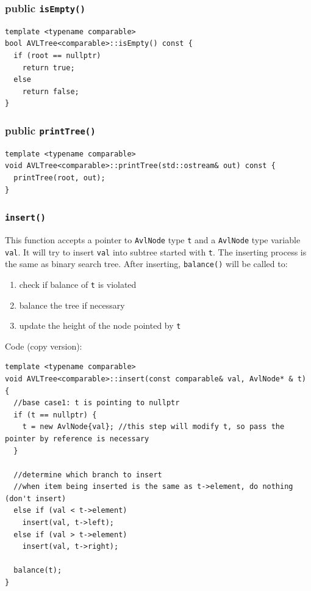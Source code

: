\documentclass[11pt]{book}
\begin{document}
\subsubsection{public \texttt{isEmpty()}}
\label{sec:orgf723b97}
\begin{verbatim}
template <typename comparable>
bool AVLTree<comparable>::isEmpty() const {
  if (root == nullptr)
    return true;
  else 
    return false;
}
\end{verbatim}
\subsubsection{public \texttt{printTree()}}
\label{sec:orga9e7e11}
\begin{verbatim}
template <typename comparable>
void AVLTree<comparable>::printTree(std::ostream& out) const {
  printTree(root, out);
}
\end{verbatim}
\subsubsection{\texttt{insert()}}
\label{sec:org3fa24a5}
This function accepts a pointer to \texttt{AvlNode} type \texttt{t} and a \texttt{AvlNode} type variable \texttt{val}. It will try to insert \texttt{val} into subtree started with \texttt{t}. The inserting process is the same as binary search tree. After inserting, \texttt{balance()} will be called to:
\begin{enumerate}
\item check if balance of \texttt{t} is violated
\item balance the tree if necessary
\item update the height of the node pointed by \texttt{t}
\end{enumerate}

Code (copy version):
\begin{verbatim}
template <typename comparable>
void AVLTree<comparable>::insert(const comparable& val, AvlNode* & t) {  
  //base case1: t is pointing to nullptr
  if (t == nullptr) {
    t = new AvlNode{val}; //this step will modify t, so pass the pointer by reference is necessary
  }

  //determine which branch to insert 
  //when item being inserted is the same as t->element, do nothing (don't insert)
  else if (val < t->element)
    insert(val, t->left);
  else if (val > t->element)
    insert(val, t->right);

  balance(t);
}
\end{verbatim}
\end{document}
